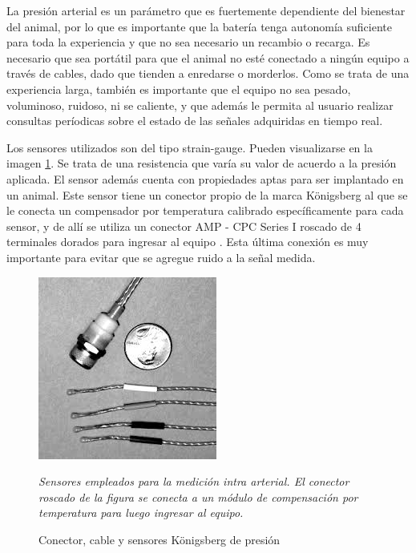 La presión arterial es un parámetro que es fuertemente dependiente del bienestar del animal, por lo que es importante que la batería tenga autonomía suficiente para toda la experiencia y que no sea necesario un recambio o recarga. Es necesario que sea portátil para que el animal no esté conectado a ningún equipo a través de cables, dado que tienden a enredarse o morderlos. Como se trata de una experiencia larga, también es importante que el equipo no sea pesado, voluminoso, ruidoso, ni se caliente, y que además le permita al usuario realizar consultas períodicas sobre el estado de las señales adquiridas en tiempo real.

Los sensores utilizados son del tipo strain-gauge. Pueden visualizarse en la imagen \ref{fig:konigsberg}. Se trata de una resistencia que varía su valor de acuerdo a la presión aplicada. El sensor además cuenta con propiedades aptas para ser implantado en un animal. Este sensor tiene un conector propio de la marca Königsberg al que se le conecta un compensador por temperatura calibrado específicamente para cada sensor, y de allí se utiliza un conector AMP - CPC Series I roscado de 4 terminales dorados para ingresar al equipo \citep{conectores2007}. Esta última conexión es muy importante para evitar que se agregue ruido a la señal medida.

\begin{figure}[!htbp]
	\centering
	
	\begin{minipage}{0.65\textwidth}
		\includegraphics[width=\textwidth]{./Figures/konigsberg.jpeg}
		{\footnotesize \textit{Sensores empleados para la medición intra arterial. El conector roscado de la figura se conecta a un módulo de compensación por temperatura para luego ingresar al equipo.}\par}		
	\end{minipage}		
		
	\caption{Conector, cable y sensores Königsberg de presión}
	\label{fig:konigsberg}
\end{figure}

